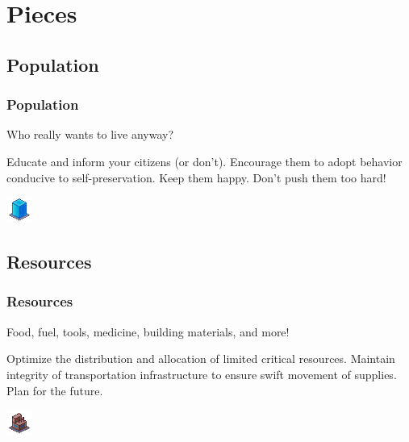 \documentclass[ascpectratio=169]{beamer}
\begin{document}

\section{Pieces}

\subsection{Population}


\begin{frame}

  \frametitle{Population}

  \begin{center}
    {\large Who really wants to live anyway?}
  \end{center}

  \begin{outline}
    \1 Educate and inform your citizens (or don't).
    \1 Encourage them to adopt behavior conducive to self-preservation.
    \1 Keep them happy.
    \1 Don't push them too hard!
  \end{outline}

  \begin{center}
    \includegraphics[scale=2.0]{../../Images/flats.png}
  \end{center}

\end{frame}


\subsection{Resources}


\begin{frame}

  \frametitle{Resources}

  \begin{center}
    {\large Food, fuel, tools, medicine, building materials, and more!}
  \end{center}

  \begin{outline}
    \1 Optimize the distribution and allocation of limited critical resources.
    \1 Maintain integrity of transportation infrastructure to ensure swift
    movement of supplies.
    \1 Plan for the future.
  \end{outline}
  
  \begin{center}
    \includegraphics[scale=3.0]{../../Images/factory.png}
  \end{center}

\end{frame}
\end{document}
